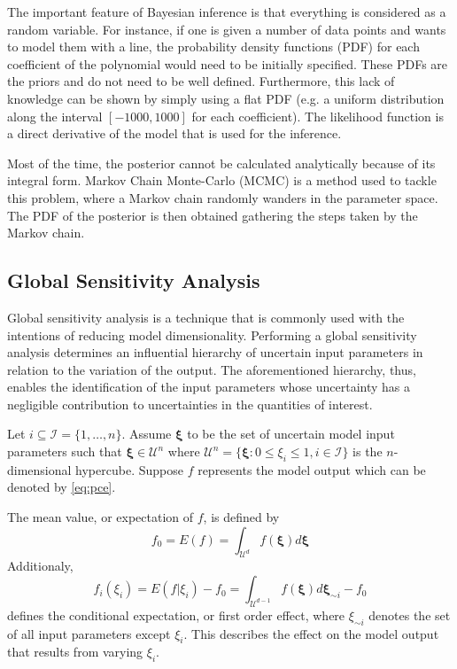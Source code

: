 \documentclass{article}
\begin{document}
The important feature of Bayesian inference is that everything is considered as
a random variable. For instance, if one is given a number of data points and
wants to model them with a line, the probability density functions (PDF) for
each coefficient of the polynomial would need to be initially specified.
These PDFs are the priors and do not need to be well defined. Furthermore,
this lack of knowledge can be shown by simply using a flat PDF (e.g. a
uniform distribution along the interval $[-1000,1000]$ for each
coefficient).
The likelihood function is a direct derivative of the model that is used for the inference. \newline

Most of the time, the posterior cannot be calculated analytically because of its
integral form. Markov Chain Monte-Carlo (MCMC) is a method used to tackle this
problem, where a Markov chain randomly wanders in the parameter space.
The PDF of the posterior is then obtained gathering the steps taken by the
Markov chain.

\subsection{Global Sensitivity Analysis}

Global sensitivity analysis is a technique that is commonly used with the
intentions of reducing model dimensionality.  Performing a global sensitivity
analysis determines an influential hierarchy of uncertain input parameters in
relation to the variation of the output.  The aforementioned hierarchy, thus,
enables the identification of the input parameters whose uncertainty has a
negligible contribution to uncertainties in the quantities of interest. \newline

Let $i \subseteq \mathcal{I} = \{ 1,\ldots,n\}$.  Assume $\boldsymbol{\xi}$ to
be the set of uncertain model input parameters such that $\boldsymbol{\xi} \in
\mathcal{U}^n$  where $\mathcal{U}^n = \{\boldsymbol{\xi} :
0 \leq \xi_i \leq 1, i \in \mathcal{I}\}$ is the $n$-dimensional hypercube.
Suppose $f$ represents the model output which can be denoted by \ref{eq:pce}.

The mean value, or expectation of $f$, is defined by
\[
f_0 = E(f) =
\int_{\mathcal{U}^d} f(\boldsymbol{\xi})d\boldsymbol{\xi}
\]
Additionaly,
\[
 f_i(\xi_i) = E(f|\xi_i)- f_0
= \int_{\mathcal{U}^{d-1}} f(\boldsymbol{\xi})d\boldsymbol{\xi}_{\sim i} - f_0
\]
defines the conditional expectation, or first order effect, where $\xi_{\sim i}$
denotes the set of all input parameters except $\xi_i$.  This describes the
effect on the model output that results from varying $\xi_i$.
\newline
\end{document}
